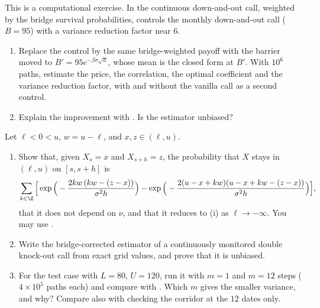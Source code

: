 \begin{exercise}\label{ex:bar-shifted-cv}
\medium This is a computational exercise. In  the continuous down-and-out call,
weighted by the bridge survival probabilities, controls the monthly down-and-out call ($B=95$) with
a variance reduction factor near $6$.
\begin{enumerate}[label=(\alph*)]
  \item Replace the control by the same bridge-weighted payoff with the barrier moved to
    $B'=95e^{-\beta\sigma\sqrt h}$, whose mean is the closed form at $B'$. With $10^6$ paths, estimate the
    price, the correlation, the optimal coefficient and the variance reduction factor, with and
    without the vanilla call as a second control.
  \item Explain the improvement with . Is the estimator unbiased?
\end{enumerate}
\end{exercise}

\begin{exercise}\label{ex:bar-corridor}
\hard Let $\ell<0<u$, $w=u-\ell$, and $x,z\in(\ell,u)$.
\begin{enumerate}[label=(\alph*)]
  \item Show that, given $X_s=x$ and $X_{s+h}=z$, the probability that $X$ stays in $(\ell,u)$ on
    $[s,s+h]$ is
    \[
      \sum_{k\in\Z}\Big[\exp\Big(-\frac{2kw\,(kw-(z-x))}{\sigma^2h}\Big)
      -\exp\Big(-\frac{2(u-x+kw)(u-x+kw-(z-x))}{\sigma^2h}\Big)\Big],
    \]
    that it does not depend on $\nu$, and that it reduces to (i) as
    $\ell\to-\infty$. You may use .
  \item Write the bridge-corrected estimator of a continuously monitored double knock-out call from
    exact grid values, and prove that it is unbiased.
  \item For the test case with $L=80$, $U=120$, run it with $m=1$ and $m=12$ steps ($4\times10^5$
    paths each) and compare with . Which $m$ gives the smaller variance, and
    why? Compare also with checking the corridor at the $12$ dates only.
\end{enumerate}
\end{exercise}
